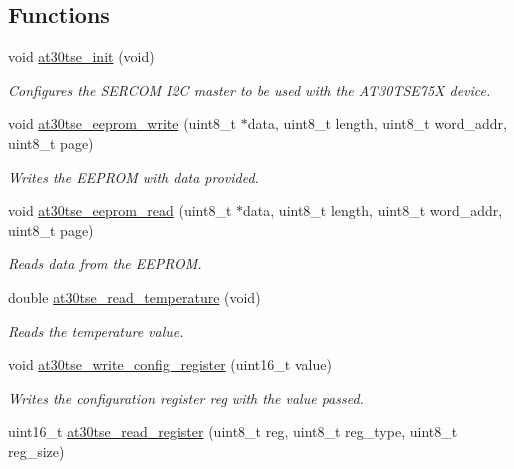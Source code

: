 \subsection*{Functions}
\begin{DoxyCompactItemize}
\item 
void \mbox{\hyperlink{group__asfdoc__sam0__at30tse75x__group_ga6690a47815ec89b0c49c8a1c6ec84e08}{at30tse\+\_\+init}} (void)
\begin{DoxyCompactList}\small\item\em Configures the S\+E\+R\+C\+OM I2C master to be used with the A\+T30\+T\+S\+E75X device. \end{DoxyCompactList}\item 
void \mbox{\hyperlink{group__asfdoc__sam0__at30tse75x__group_ga9b61db47b62de4af26ffc0864ae5a86a}{at30tse\+\_\+eeprom\+\_\+write}} (uint8\+\_\+t $\ast$data, uint8\+\_\+t length, uint8\+\_\+t word\+\_\+addr, uint8\+\_\+t page)
\begin{DoxyCompactList}\small\item\em Writes the E\+E\+P\+R\+OM with data provided. \end{DoxyCompactList}\item 
void \mbox{\hyperlink{group__asfdoc__sam0__at30tse75x__group_ga906d79173e2ad02ce77203db458aa1ef}{at30tse\+\_\+eeprom\+\_\+read}} (uint8\+\_\+t $\ast$data, uint8\+\_\+t length, uint8\+\_\+t word\+\_\+addr, uint8\+\_\+t page)
\begin{DoxyCompactList}\small\item\em Reads data from the E\+E\+P\+R\+OM. \end{DoxyCompactList}\item 
double \mbox{\hyperlink{group__asfdoc__sam0__at30tse75x__group_ga266be5475b64f6c2167851a81567e203}{at30tse\+\_\+read\+\_\+temperature}} (void)
\begin{DoxyCompactList}\small\item\em Reads the temperature value. \end{DoxyCompactList}\item 
void \mbox{\hyperlink{group__asfdoc__sam0__at30tse75x__group_ga349fec0b2cdbe66a733483f4e348de73}{at30tse\+\_\+write\+\_\+config\+\_\+register}} (uint16\+\_\+t value)
\begin{DoxyCompactList}\small\item\em Writes the configuration register reg with the value passed. \end{DoxyCompactList}\item 
uint16\+\_\+t \mbox{\hyperlink{group__asfdoc__sam0__at30tse75x__group_gaa67338170e6fcaa17f859d11c85628de}{at30tse\+\_\+read\+\_\+register}} (uint8\+\_\+t reg, uint8\+\_\+t reg\+\_\+type, uint8\+\_\+t reg\+\_\+size)

\end{DoxyCompactItemize}
